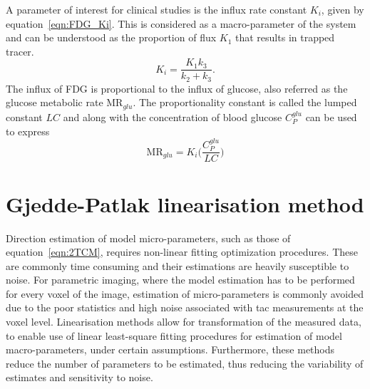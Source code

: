 A parameter of interest for clinical studies is the influx rate constant $K_i$, given by equation~\ref{eqn:FDG_Ki}. This is considered as a macro-parameter of the system and can be understood as the proportion of flux $K_1$ that results in trapped tracer.
%
\begin{equation}
K_i = \frac{K_1 k_3}{k_2+k_3} . 
\label{eqn:FDG_Ki}
\end{equation}
%
The influx of FDG is proportional to the influx of glucose, also referred as the glucose metabolic rate $\textrm{MR}_{glu}$. The proportionality constant is called the lumped constant $LC$ and along with the concentration of blood glucose $C_{P}^{glu}$ can be used to express
\begin{equation}
\textrm{MR}_{glu} = K_i \Big(\frac{C_{P}^{glu}}{LC}\Big)
\label{eqn:MR_glu}
\end{equation}
%

\section{Gjedde-Patlak linearisation method}
Direction estimation of model micro-parameters, such as those of equation~\ref{eqn:2TCM}, requires non-linear fitting optimization procedures. These are commonly time consuming and their estimations are heavily susceptible to noise.
For parametric imaging, where the model estimation has to be performed for every voxel of the image, estimation of micro-parameters is commonly avoided due to the poor statistics and high noise associated with \gls{tac} measurements at the voxel level. 
Linearisation methods allow for transformation of the measured data, to enable use of linear least-square fitting procedures for estimation of model macro-parameters, under certain assumptions. Furthermore, these methods reduce the number of parameters to be estimated, thus reducing the variability of estimates and sensitivity to noise. 


